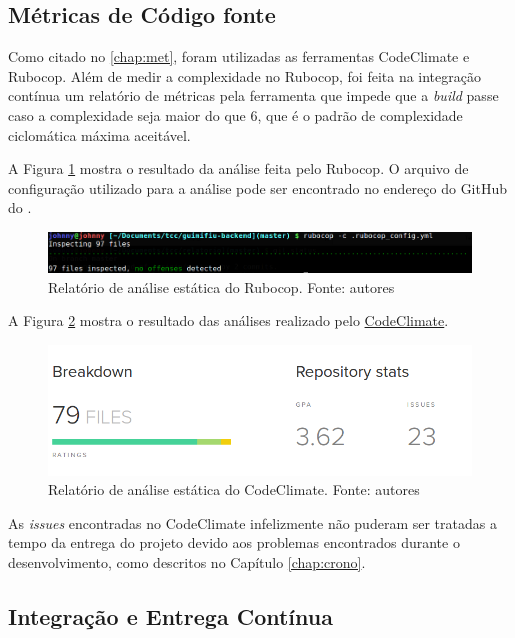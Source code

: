 \subsection{Métricas de Código fonte}

Como citado no \autoref{chap:met}, foram utilizadas as ferramentas CodeClimate e Rubocop. Além de medir a complexidade no Rubocop, foi feita na integração contínua um relatório de métricas pela ferramenta que impede que a \textit{build} passe caso a complexidade seja maior do que 6, que é o padrão de complexidade ciclomática máxima aceitável.

A Figura \ref{img:rubocop} mostra o resultado da análise feita pelo Rubocop. O arquivo de configuração utilizado para a análise pode ser encontrado no endereço do GitHub do  .

\begin{figure}[H]
    \centering
    \includegraphics[scale=0.5]{figuras/rubocop.png}
    \caption[Relatório de análise estática do Rubocop]{Relatório de análise estática do Rubocop. Fonte: autores}
    \label{img:rubocop}
\end{figure}

A Figura \ref{img:codeclimate} mostra o resultado das análises realizado pelo \href{https://codeclimate.com/github/Guimifiu/guimifiu-backend/}{CodeClimate}.

\begin{figure}[H]
    \centering
    \includegraphics[scale=0.5]{figuras/codeclimate.png}
    \caption[Relatório de análise estática do CodeClimate]{Relatório de análise estática do CodeClimate. Fonte: autores}
    \label{img:codeclimate}
\end{figure}

As \textit{issues} encontradas no CodeClimate infelizmente não puderam ser tratadas a tempo da entrega do projeto devido aos problemas encontrados durante o desenvolvimento, como descritos no Capítulo \ref{chap:crono}.


\subsection{Integração e Entrega Contínua}

